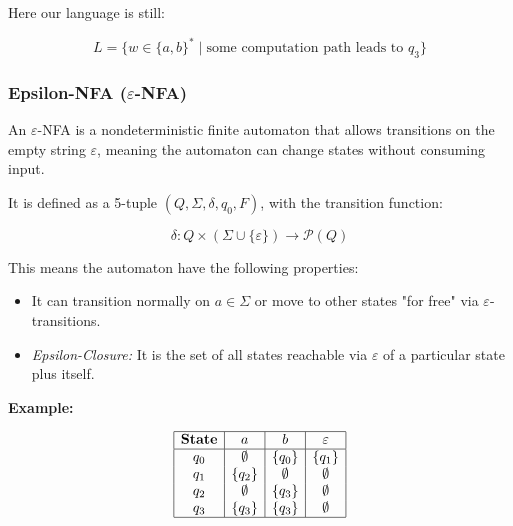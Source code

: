 Here our language is still:

\[
    L = \{ w \in \{a,b\}^* \mid \text{some computation path leads to } q_3 \}
\]

\subsubsection{Epsilon-NFA \texorpdfstring{(\(\varepsilon\)-NFA)}{}}  

An \(\varepsilon\)-NFA is a nondeterministic finite automaton that allows transitions on the empty string 
\(\varepsilon\), meaning the automaton can change states without consuming input.

It is defined as a 5-tuple \((Q, \Sigma, \delta, q_0, F)\), with the transition function:

\[
    \delta: Q \times (\Sigma \cup \{\varepsilon\}) \to \mathcal{P}(Q)
\]

This means the automaton have the following properties:

\begin{itemize}
    
    \item It can transition normally on \(a \in \Sigma\) or move to other states "for free" via 
    \(\varepsilon\)-transitions.
    
    \item \emph{Epsilon-Closure:} It is the set of all states reachable via \(\varepsilon\) of a particular 
    state plus itself. 

\end{itemize}

\textbf{Example:}

\[
    \begin{array}{|c|c|c|c|}
    \hline
    \textbf{State} & a & b & \varepsilon \\
    \hline
    q_0 & \emptyset & \{q_0\} & \{q_1\} \\
    q_1 & \{q_2\} & \emptyset & \emptyset \\
    q_2 & \emptyset & \{q_3\} & \emptyset \\
    q_3 & \{q_3\} & \{q_3\} & \emptyset \\
    \hline
    \end{array}
\]

\begin{center}
\end{center}

